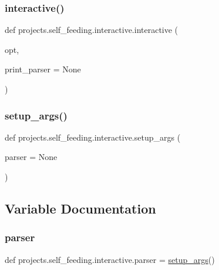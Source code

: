 \subsubsection{\texorpdfstring{interactive()}{interactive()}}
{\footnotesize\ttfamily def projects.\+self\+\_\+feeding.\+interactive.\+interactive (\begin{DoxyParamCaption}\item[{}]{opt,  }\item[{}]{print\+\_\+parser = {\ttfamily None} }\end{DoxyParamCaption})}

\mbox{\label{namespaceprojects_1_1self__feeding_1_1interactive_a2ad3b874d9caef6e76ea41e029b933f0}} 
\subsubsection{\texorpdfstring{setup\+\_\+args()}{setup\_args()}}
{\footnotesize\ttfamily def projects.\+self\+\_\+feeding.\+interactive.\+setup\+\_\+args (\begin{DoxyParamCaption}\item[{}]{parser = {\ttfamily None} }\end{DoxyParamCaption})}



\subsection{Variable Documentation}
\mbox{\label{namespaceprojects_1_1self__feeding_1_1interactive_abee9c3a7fd264e2b68724476c79beda7}} 
\subsubsection{\texorpdfstring{parser}{parser}}
{\footnotesize\ttfamily def projects.\+self\+\_\+feeding.\+interactive.\+parser = \hyperlink{namespaceprojects_1_1self__feeding_1_1interactive_a2ad3b874d9caef6e76ea41e029b933f0}{setup\+\_\+args}()}

